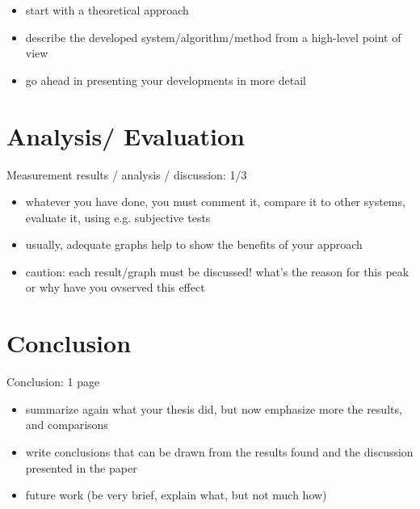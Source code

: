 \begin{itemize}
    \item start with a theoretical approach
    \item describe the developed system/algorithm/method from a high-level point of view
    \item go ahead in presenting your developments in more detail
\end{itemize}


\chapter{Analysis/ Evaluation}

Measurement results / analysis / discussion: 1/3

\begin{itemize}
    \item whatever you have done, you must comment it, compare it to other systems, evaluate it, using e.g. subjective tests
    \item usually, adequate graphs help to show the benefits of your approach
    \item caution: each result/graph must be discussed! what's the reason for this peak or why have you ovserved this effect
\end{itemize}


\chapter{Conclusion}

Conclusion: 1 page

\begin{itemize}
    \item summarize again what your thesis did, but now emphasize more the results, and comparisons
    \item write conclusions that can be drawn from the results found and the discussion presented in the paper
    \item future work (be very brief, explain what, but not much how)
\end{itemize}

